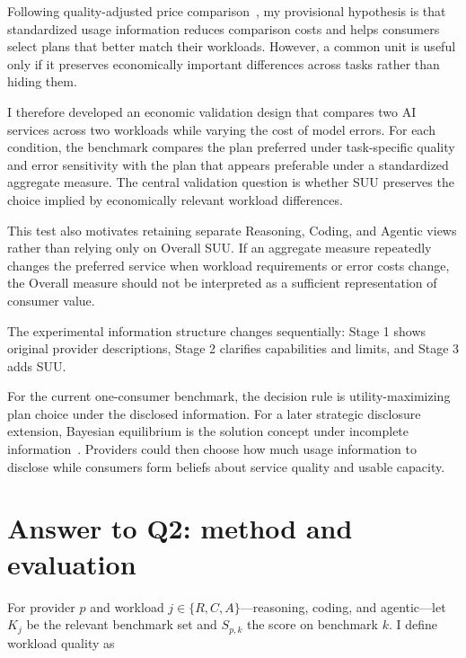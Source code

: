 \documentclass[sigconf,nonacm]{acmart}
\begin{document}
\vspace{0.5em}

Following quality-adjusted price comparison~\cite{ehrlich2026},
my provisional hypothesis is that standardized usage information reduces
comparison costs and helps consumers select plans that better match their
workloads. However, a common unit is useful only if it preserves economically
important differences across tasks rather than hiding them.

I therefore developed an economic validation design that compares two AI
services across two workloads while varying the cost of model errors.
For each condition, the benchmark compares the plan preferred under
task-specific quality and error sensitivity with the plan that appears preferable
under a standardized aggregate measure. The central validation question is
whether SUU preserves the choice implied by economically relevant workload
differences.

This test also motivates retaining separate Reasoning, Coding, and Agentic
views rather than relying only on Overall SUU. If an aggregate measure repeatedly
changes the preferred service when workload requirements or error costs change,
the Overall measure should not be interpreted as a sufficient representation of
consumer value.

The experimental information structure changes sequentially:
Stage 1 shows original provider descriptions,
Stage 2 clarifies capabilities and limits,
and Stage 3 adds SUU.

For the current one-consumer benchmark, the decision rule is
utility-maximizing plan choice under the disclosed information.
For a later strategic disclosure extension, Bayesian equilibrium is
the solution concept under incomplete information~\cite{harsanyi1968}.
Providers could then choose how much usage information to disclose while
consumers form beliefs about service quality and usable capacity.



\section{Answer to Q2: method and evaluation}

For provider $p$ and workload $j\in\{R,C,A\}$---reasoning, coding, and
agentic---let $K_j$ be the relevant benchmark set and $S_{p,k}$ the score on
benchmark $k$. I define workload quality as
\end{document}

